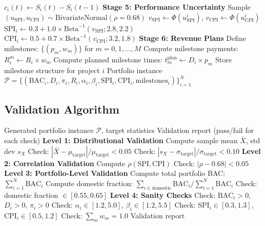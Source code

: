 \begin{algorithm}[H]
\begin{algorithmic}[1]
        \State $c_i(t) \gets S_i(t) - S_i(t-1)$ 
    \EndFor
\EndFor
\State
\State \textbf{Stage 5: Performance Uncertainty}
\State Sample $(u_{\text{SPI}}, u_{\text{CPI}}) \sim \text{BivariateNormal}(\rho = 0.68)$
    \State $v_{\text{SPI}} \gets \Phi(u_{\text{SPI}}^i)$, $v_{\text{CPI}} \gets \Phi(u_{\text{CPI}}^i)$
    \State $\text{SPI}_i \gets 0.3 + 1.0 \times \text{Beta}^{-1}(v_{\text{SPI}}; 2.8, 2.2)$
    \State $\text{CPI}_i \gets 0.5 + 0.7 \times \text{Beta}^{-1}(v_{\text{CPI}}; 3.2, 1.8)$
\EndFor
\State
\State \textbf{Stage 6: Revenue Plans}
    \State Define milestones: $\{(p_m, w_m)\}$ for $m = 0, 1, \ldots, M$
    \State Compute milestone payments: $R_i^m \gets R_i \times w_m$
    \State Compute planned milestone times: $t_m^{\text{plan}} \gets D_i \times p_m$
    \State Store milestone structure for project $i$
\EndFor
\State
\State \Return Portfolio instance $\mathcal{P} = \{(\text{BAC}_i, D_i, \pi_i, R_i, \alpha_i, \beta_i, \text{SPI}_i, \text{CPI}_i, \text{milestones}_i)\}_{i=1}^N$
\end{algorithmic}
\end{algorithm}

\subsection{Validation Algorithm}

\begin{algorithm}[H]
\caption{Instance Validation}
\label{alg:validation}
\begin{algorithmic}[1]
\Require Generated portfolio instance $\mathcal{P}$, target statistics
\Ensure Validation report (pass/fail for each check)
\State
\State \textbf{Level 1: Distributional Validation}
    \State Compute sample mean $\bar{X}$, std dev $s_X$
    \State Check: $|\bar{X} - \mu_{\text{target}}| / \mu_{\text{target}} < 0.05$ 
    \State Check: $|s_X - \sigma_{\text{target}}| / \sigma_{\text{target}} < 0.10$ 
\EndFor
\State
\State \textbf{Level 2: Correlation Validation}
\State Compute $\rho(\text{SPI}, \text{CPI})$
\State Check: $|\rho - 0.68| < 0.05$
\State
\State \textbf{Level 3: Portfolio-Level Validation}
\State Compute total portfolio BAC: $\sum_{i=1}^N \text{BAC}_i$
\State Compute domestic fraction: $\sum_{i \in \text{domestic}} \text{BAC}_i / \sum_{i=1}^N \text{BAC}_i$
\State Check: domestic fraction $\in [0.55, 0.65]$ 
\State
\State \textbf{Level 4: Sanity Checks}
    \State Check: $\text{BAC}_i > 0$, $D_i > 0$, $\pi_i > 0$
    \State Check: $\alpha_i \in [1.2, 5.0]$, $\beta_i \in [1.2, 5.5]$
    \State Check: $\text{SPI}_i \in [0.3, 1.3]$, $\text{CPI}_i \in [0.5, 1.2]$
    \State Check: $\sum_m w_m = 1.0$ 
\EndFor
\State
\State \Return Validation report
\end{algorithmic}
\end{algorithm}

